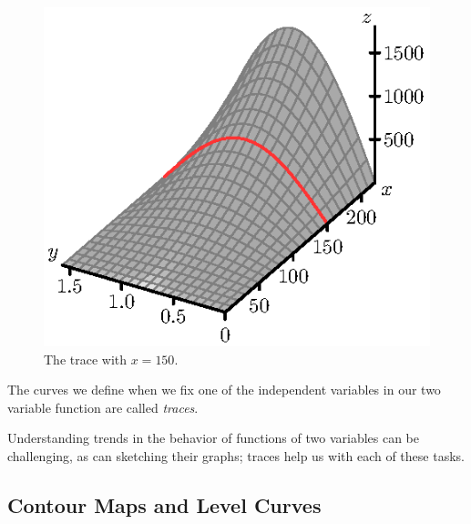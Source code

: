 \begin{figure}[ht]
\begin{center}
\begin{minipage}{2.5in}
\begin{center}
  \includegraphics{figures/fig_9_1_x_range.eps}
\caption{The trace with $x = 150$.}
\label{F:9.1.trace2}
\end{center}
\end{minipage}
\end{center}
\end{figure}

The curves we define when we fix one of the independent variables in our two variable function are called \emph{traces}.

\vspace*{5pt}
\nin {}
\vspace*{5pt}

Understanding trends in the behavior of functions of two variables can
be challenging, as can sketching their graphs; traces help us with
each of these tasks.



%

\subsection*{Contour Maps and Level Curves}

